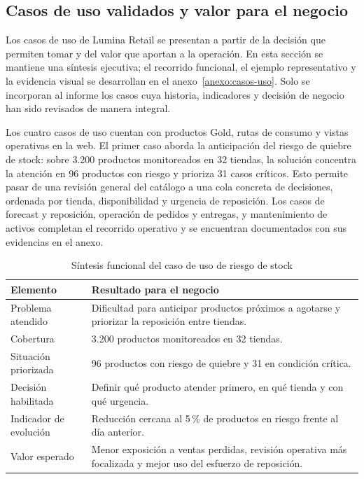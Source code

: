 \documentclass[11pt,a4paper]{article}
\begin{document}
\subsection{Casos de uso validados y valor para el negocio}
Los casos de uso de Lumina Retail se presentan a partir de la decisión que permiten tomar y del valor que aportan a la operación. En esta sección se mantiene una síntesis ejecutiva; el recorrido funcional, el ejemplo representativo y la evidencia visual se desarrollan en el anexo~\ref{anexo:casos-uso}. Solo se incorporan al informe los casos cuya historia, indicadores y decisión de negocio han sido revisados de manera integral.

Los cuatro casos de uso cuentan con productos Gold, rutas de consumo y vistas operativas en la web. El primer caso aborda la anticipación del riesgo de quiebre de stock: sobre 3.200 productos monitoreados en 32 tiendas, la solución concentra la atención en 96 productos con riesgo y prioriza 31 casos críticos. Esto permite pasar de una revisión general del catálogo a una cola concreta de decisiones, ordenada por tienda, disponibilidad y urgencia de reposición. Los casos de forecast y reposición, operación de pedidos y entregas, y mantenimiento de activos completan el recorrido operativo y se encuentran documentados con sus evidencias en el anexo.

\begin{table}[H]
\caption{Síntesis funcional del caso de uso de riesgo de stock}\label{tab:caso-riesgo-stock}
\small
\begin{tabularx}{\linewidth}{@{}P{.24\linewidth}Y@{}}\toprule
Elemento & Resultado para el negocio\\\midrule
Problema atendido & Dificultad para anticipar productos próximos a agotarse y priorizar la reposición entre tiendas.\\
Cobertura & 3.200 productos monitoreados en 32 tiendas.\\
Situación priorizada & 96 productos con riesgo de quiebre y 31 en condición crítica.\\
Decisión habilitada & Definir qué producto atender primero, en qué tienda y con qué urgencia.\\
Indicador de evolución & Reducción cercana al 5\,\% de productos en riesgo frente al día anterior.\\
Valor esperado & Menor exposición a ventas perdidas, revisión operativa más focalizada y mejor uso del esfuerzo de reposición.\\\bottomrule
\end{tabularx}
\end{table}
\end{document}
